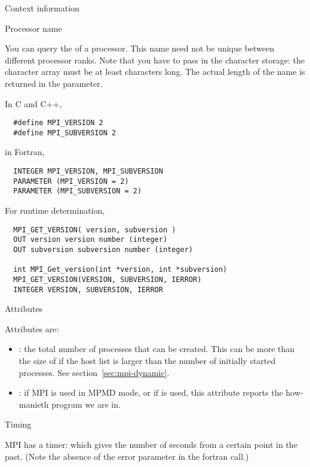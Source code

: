  {Context information}
\label{sec:context}

 {Processor name}

You can query the  of a processor.
This name need not be unique between different processor ranks.
%
%
Note that you have to pass in the character storage:
the character array must be at least  characters long.
The actual length of the name is returned in the  parameter.

In C and C++,
\begin{verbatim}
  #define MPI_VERSION 2
  #define MPI_SUBVERSION 2
\end{verbatim}
in Fortran,
\begin{verbatim}
  INTEGER MPI_VERSION, MPI_SUBVERSION
  PARAMETER (MPI_VERSION = 2)
  PARAMETER (MPI_SUBVERSION = 2)
\end{verbatim}
For runtime determination,
\begin{verbatim}
  MPI_GET_VERSION( version, subversion )
  OUT version version number (integer)
  OUT subversion subversion number (integer)

  int MPI_Get_version(int *version, int *subversion)
  MPI_GET_VERSION(VERSION, SUBVERSION, IERROR)
  INTEGER VERSION, SUBVERSION, IERROR
\end{verbatim}

 {Attributes}


Attributes are:
\begin{itemize}
\item {}: the total number of processes
  that can be created. This can be more than the size of
   if the host list is larger than the number of
  initially started processes. See section~\ref{sec:mpi-dynamic}.
\item {}: if MPI is used in \ac{MPMD} mode, or
  if  is used, this attribute
  reports the how-manieth program we are in.
\end{itemize}

 {Timing}

MPI has a  timer: 
%
%
which gives the number of seconds from a certain point in the past.
(Note the absence of the error parameter in the fortran call.)

